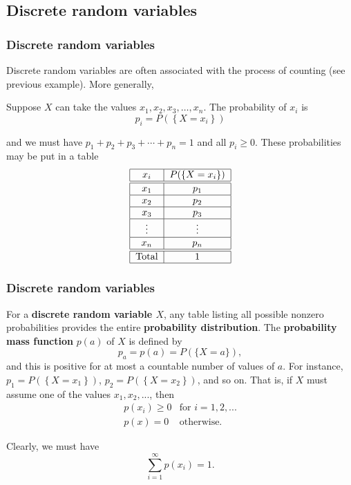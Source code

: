 \documentclass[notes=show,smaller,handout]{beamer}
\newcommand{\bea}{\begin{eqnarray}}
\newcommand{\eea}{\end{eqnarray}}
\newcommand{\nn}{\nonumber}
\begin{document}
\subsection{Discrete random variables}

\begin{frame}%

\frametitle{Discrete random variables}

Discrete random variables are often associated with the process of counting (see previous
example). More generally, 
\begin{definition}
Suppose $X$ can take the values $x_{1},x_{2},x_{3},\ldots ,x_{n}$. The probability of $x_{i}$ is 
$$p_{i}= P(\left\{ X=x_i\right\})$$

and we must have $p_{1}+p_{2}+p_{3}+\cdots +p_{n}=1$ and all $p_{i}\geq 0$. These probabilities may be put in a table%
\begin{equation*}
\begin{tabular}{|c|c|}
\hline
$x_i $ & $P(\left\{ X=x_i\right\}) $ \\ \hline\hline
$x_{1}$ & $p_{1}$ \\ \hline
$x_{2}$ & $p_{2}$ \\ \hline
$x_{3}$ & $p_{3}$ \\ \hline
$\vdots $ & $\vdots $ \\ \hline
$x_{n}$ & $p_{n}$ \\ \hline\hline
Total & $1$ \\ \hline
\end{tabular}%
\end{equation*}
\end{definition}
\end{frame}%

\begin{frame}%

\frametitle{Discrete random variables}


For a \textbf{discrete random variable $X$}, any table listing all
possible nonzero probabilities provides the entire \textbf{probability
distribution}. The \textbf{probability mass function} $p(a)$ of $X$ is defined by
$$ p_a = p(a)= P(\{X=a \}),
$$
and this is positive for at most a countable number of values of $a$. For instance, 
$p_{1} = P(\left\{ X=x_1\right\})$, $p_{2} = P(\left\{ X=x_2\right\})$, and so on. 
That is, if $X$ must assume
one of the values $x_1,x_2,...$, then
\bea
 p(x_i) \geq 0 & \text{for \ \ } i=1,2,... \nn \\
 p(x) = 0 & \text{otherwise.}
\eea 

Clearly, we must have 
$$
\sum_{i=1}^{\infty} p(x_i) = 1.
$$



\end{frame}%
\end{document}
